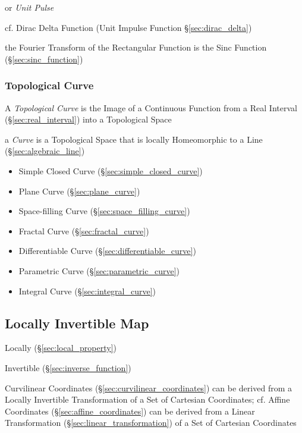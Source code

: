 
or \emph{Unit Pulse}

cf. Dirac Delta Function (Unit Impulse Function \S\ref{sec:dirac_delta})

the Fourier Transform of the Rectangular Function is the Sinc Function
(\S\ref{sec:sinc_function})



\subsubsection{Topological Curve}\label{sec:topological_curve}

A \emph{Topological Curve} is the Image of a Continuous Function from a Real
Interval (\S\ref{sec:real_interval}) into a Topological Space

a \emph{Curve} is a Topological Space that is locally Homeomorphic to a Line
(\S\ref{sec:algebraic_line})

\begin{itemize}
  \item Simple Closed Curve (\S\ref{sec:simple_closed_curve})
  \item Plane Curve (\S\ref{sec:plane_curve})
  \item Space-filling Curve (\S\ref{sec:space_filling_curve})
  \item Fractal Curve (\S\ref{sec:fractal_curve})
  \item Differentiable Curve (\S\ref{sec:differentiable_curve})
  \item Parametric Curve (\S\ref{sec:parametric_curve})
  \item Integral Curve (\S\ref{sec:integral_curve})
\end{itemize}



\subsection{Locally Invertible Map}\label{sec:locally_invertible}

Locally (\S\ref{sec:local_property})

Invertible (\S\ref{sec:inverse_function})

Curvilinear Coordinates (\S\ref{sec:curvilinear_coordinates}) can be derived
from a Locally Invertible Transformation of a Set of Cartesian Coordinates; cf.
Affine Coordinates (\S\ref{sec:affine_coordinates}) can be derived from a Linear
Transformation (\S\ref{sec:linear_transformation}) of a Set of Cartesian
Coordinates

